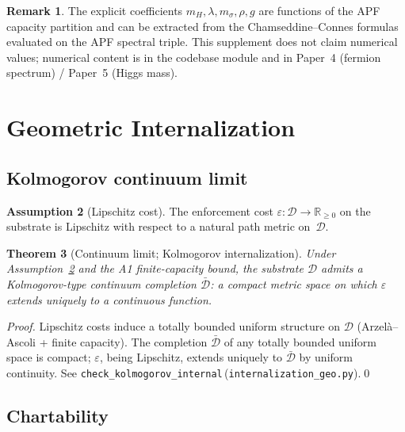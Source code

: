 \documentclass[11pt,a4paper]{article}
\newtheorem{theorem}{Theorem}[section]
\theoremstyle{definition}
\newtheorem{remark}[theorem]{Remark}
\newtheorem{assumption}[theorem]{Assumption}
\newcommand{\eps}{\varepsilon}
\newcommand{\coderef}[2]{\texttt{#1}\,(\texttt{#2})}
\begin{document}
\begin{remark}
The explicit coefficients $m_H,\lambda,m_\sigma,\rho,g$ are functions of the APF capacity partition and can be extracted from the Chamseddine--Connes formulas evaluated on the APF spectral triple.  This supplement does not claim numerical values; numerical content is in the codebase module and in Paper~4 (fermion spectrum) / Paper~5 (Higgs mass).
\end{remark}

\section{Geometric Internalization}\label{sec:geo}
\setcounter{theorem}{0}

\subsection{Kolmogorov continuum limit}

\begin{assumption}[Lipschitz cost]
\label{ass:lipschitz}
The enforcement cost $\eps:\mathcal{D}\to\mathbb{R}_{\geq 0}$ on the substrate is Lipschitz with respect to a natural path metric on~$\mathcal{D}$.
\end{assumption}

\begin{theorem}[Continuum limit; Kolmogorov internalization]
\label{thm:kolmo}
Under Assumption~\ref{ass:lipschitz} and the A1 finite-capacity bound, the substrate $\mathcal{D}$ admits a Kolmogorov-type continuum completion $\bar{\mathcal{D}}$: a compact metric space on which $\eps$ extends uniquely to a continuous function.
\end{theorem}

\begin{proof}
Lipschitz costs induce a totally bounded uniform structure on $\mathcal{D}$ (Arzelà--Ascoli + finite capacity).  The completion $\bar{\mathcal{D}}$ of any totally bounded uniform space is compact; $\eps$, being Lipschitz, extends uniquely to $\bar{\mathcal{D}}$ by uniform continuity.  See \coderef{check\_kolmogorov\_internal}{internalization\_geo.py}.\qed
\end{proof}

\subsection{Chartability}
\end{document}
